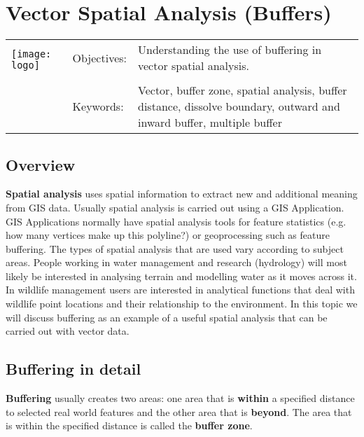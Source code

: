 

\section{Vector Spatial Analysis (Buffers)}\label{sec:buffer}
\begin{tabular}{p{3.5cm}p{6cm}p{6cm}}
\multirow{2}{*}{\texttt{[image: logo]}} & Objectives: &
Understanding the use of buffering in vector spatial analysis. \\
& & \\
& Keywords: & 
Vector, buffer zone, spatial analysis, buffer distance, dissolve boundary,
outward and inward buffer, multiple buffer  \\
\hline
\end{tabular}

\subsection{Overview}

\textbf{Spatial analysis} uses spatial information to extract new and additional
meaning from GIS data. Usually spatial analysis is carried out using a GIS
Application. GIS Applications normally have spatial analysis tools for
feature statistics (e.g. how many vertices make up this polyline?) or
geoprocessing such as feature buffering. The types of spatial analysis that
are used vary according to subject areas. People working in water management
and research (hydrology) will most likely be interested in analysing terrain
and modelling water as it moves across it.  In wildlife management users are
interested in analytical functions that deal with wildlife point locations
and their relationship to the environment. In this topic we will discuss
buffering as an example of a useful spatial analysis that can be carried out
with vector data.

\subsection{Buffering in detail}

\textbf{Buffering} usually creates two areas: one area that is
\textbf{within} a specified distance to selected real world features and the
other area that is \textbf{beyond}. The area that is within the specified
distance is called the \textbf{buffer zone}.

